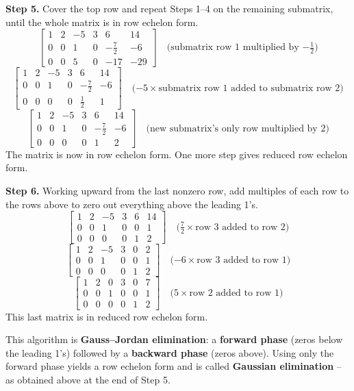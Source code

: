 \documentclass{article}
\theoremstyle{mystyle}
\begin{document}
\noindent\textbf{Step 5.} Cover the top row and repeat Steps 1--4 on the remaining submatrix, until the whole matrix is in row echelon form.
\[
\begin{bmatrix}1&2&-5&3&6&14\\0&0&1&0&-\tfrac72&-6\\0&0&5&0&-17&-29\end{bmatrix}
\quad\text{(submatrix row 1 multiplied by $-\tfrac12$)}
\]
\[
\begin{bmatrix}1&2&-5&3&6&14\\0&0&1&0&-\tfrac72&-6\\0&0&0&0&\tfrac12&1\end{bmatrix}
\quad\text{($-5\times$submatrix row 1 added to submatrix row 2)}
\]
\[
\begin{bmatrix}1&2&-5&3&6&14\\0&0&1&0&-\tfrac72&-6\\0&0&0&0&1&2\end{bmatrix}
\quad\text{(new submatrix's only row multiplied by $2$)}
\]
The matrix is now in row echelon form. One more step gives reduced row echelon form.

\noindent\textbf{Step 6.} Working upward from the last nonzero row, add multiples of each row to the rows above to zero out everything above the leading 1's.
\[
\begin{bmatrix}1&2&-5&3&6&14\\0&0&1&0&0&1\\0&0&0&0&1&2\end{bmatrix}
\quad\text{($\tfrac72\times$row 3 added to row 2)}
\]
\[
\begin{bmatrix}1&2&-5&3&0&2\\0&0&1&0&0&1\\0&0&0&0&1&2\end{bmatrix}
\quad\text{($-6\times$row 3 added to row 1)}
\]
\[
\begin{bmatrix}1&2&0&3&0&7\\0&0&1&0&0&1\\0&0&0&0&1&2\end{bmatrix}
\quad\text{($5\times$row 2 added to row 1)}
\]
This last matrix is in reduced row echelon form.

This algorithm is \textbf{Gauss--Jordan elimination}: a \textbf{forward phase} (zeros below the leading 1's) followed by a \textbf{backward phase} (zeros above). Using only the forward phase yields a row echelon form and is called \textbf{Gaussian elimination} -- as obtained above at the end of Step 5.
\end{document}
